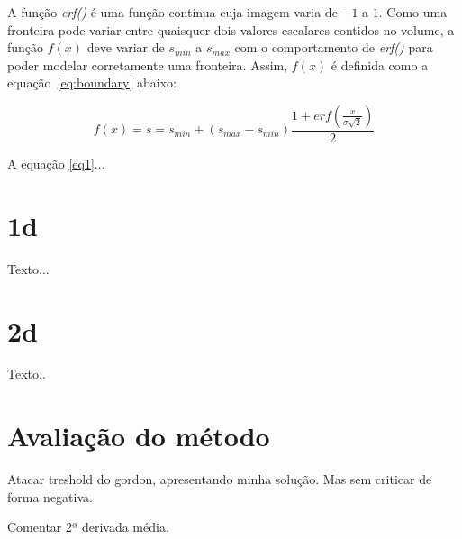	A função \textit{erf()} é uma função contínua cuja imagem varia de $-1$ a $1$. Como uma fronteira pode variar entre quaisquer dois valores escalares contidos no volume, a função $f(x)$ deve variar de $s_{min}$ a $s_{max}$ com o comportamento de \textit{erf()} para poder modelar corretamente uma fronteira. Assim, $f(x)$ é definida como a equação~\eqref{eq:boundary} abaixo:

\begin{equation} \label{eq:boundary}
	f(x) = s = s_{min} + (s_{max} - s_{min}) \frac{1 + erf(\frac{x}{\sigma\sqrt{2}})}{2}
\end{equation}
	
	A equação \eqref{eq1}...
    
\section{1d}
\label{gordon.1d}
	Texto...
    
\section{2d}
\label{gordon.2d}    
    Texto..
    
\section{Avaliação do método}
\label{gordon.aval}    
    Atacar treshold do gordon, apresentando minha solução. Mas sem criticar de forma negativa.
    
    Comentar 2ª derivada média.